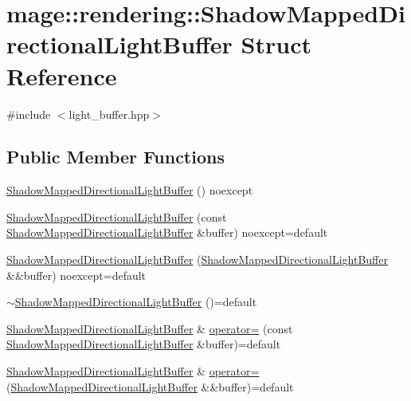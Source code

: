 \hypertarget{structmage_1_1rendering_1_1_shadow_mapped_directional_light_buffer}{}\section{mage\+:\+:rendering\+:\+:Shadow\+Mapped\+Directional\+Light\+Buffer Struct Reference}
\label{structmage_1_1rendering_1_1_shadow_mapped_directional_light_buffer}


{\ttfamily \#include $<$light\+\_\+buffer.\+hpp$>$}

\subsection*{Public Member Functions}
\begin{DoxyCompactItemize}
\item 
\mbox{\hyperlink{structmage_1_1rendering_1_1_shadow_mapped_directional_light_buffer_ad3467d873a7c1b756df37458b49bf43f}{Shadow\+Mapped\+Directional\+Light\+Buffer}} () noexcept
\item 
\mbox{\hyperlink{structmage_1_1rendering_1_1_shadow_mapped_directional_light_buffer_a984e2af2b6319226b6e896e28fc056b8}{Shadow\+Mapped\+Directional\+Light\+Buffer}} (const \mbox{\hyperlink{structmage_1_1rendering_1_1_shadow_mapped_directional_light_buffer}{Shadow\+Mapped\+Directional\+Light\+Buffer}} \&buffer) noexcept=default
\item 
\mbox{\hyperlink{structmage_1_1rendering_1_1_shadow_mapped_directional_light_buffer_a35a9ceeb8616a77cf263769f0526db28}{Shadow\+Mapped\+Directional\+Light\+Buffer}} (\mbox{\hyperlink{structmage_1_1rendering_1_1_shadow_mapped_directional_light_buffer}{Shadow\+Mapped\+Directional\+Light\+Buffer}} \&\&buffer) noexcept=default
\item 
\mbox{\hyperlink{structmage_1_1rendering_1_1_shadow_mapped_directional_light_buffer_a5566778f8ff3351b7e37240fe8a3dbf1}{$\sim$\+Shadow\+Mapped\+Directional\+Light\+Buffer}} ()=default
\item 
\mbox{\hyperlink{structmage_1_1rendering_1_1_shadow_mapped_directional_light_buffer}{Shadow\+Mapped\+Directional\+Light\+Buffer}} \& \mbox{\hyperlink{structmage_1_1rendering_1_1_shadow_mapped_directional_light_buffer_ab124ed92e958ec42786045e1c235f54b}{operator=}} (const \mbox{\hyperlink{structmage_1_1rendering_1_1_shadow_mapped_directional_light_buffer}{Shadow\+Mapped\+Directional\+Light\+Buffer}} \&buffer)=default
\item 
\mbox{\hyperlink{structmage_1_1rendering_1_1_shadow_mapped_directional_light_buffer}{Shadow\+Mapped\+Directional\+Light\+Buffer}} \& \mbox{\hyperlink{structmage_1_1rendering_1_1_shadow_mapped_directional_light_buffer_a85fdaabbf857d35be6874e94de4aa86e}{operator=}} (\mbox{\hyperlink{structmage_1_1rendering_1_1_shadow_mapped_directional_light_buffer}{Shadow\+Mapped\+Directional\+Light\+Buffer}} \&\&buffer)=default
\end{DoxyCompactItemize}
